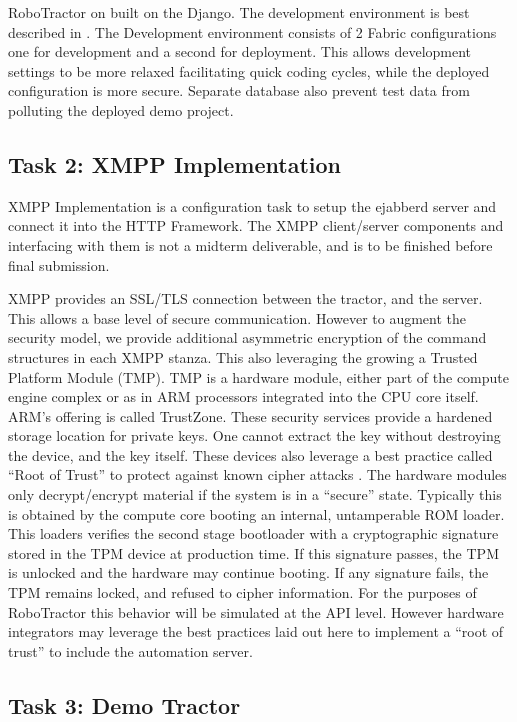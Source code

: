 \documentclass[conference,12pt]{IEEEtran}
\begin{document}
RoboTractor on built on the Django. The development environment is best
described in \autocite{_django_2014}. The Development environment consists of
2 Fabric configurations one for development and a second for deployment. This
  allows development settings to be more relaxed facilitating quick coding
  cycles, while the deployed configuration is more secure. Separate database
  also prevent test data from polluting the deployed demo project.

\subsection{Task 2: XMPP Implementation}
\label{sec:xmpp}
XMPP Implementation is a configuration task to setup the ejabberd server and
connect it into the HTTP Framework. The XMPP client/server components and
interfacing with them is not a midterm deliverable, and is to be finished before
final submission.

XMPP provides an SSL/TLS connection between the tractor, and the server. This
allows a base level of secure communication.  However to augment the security
model, we provide additional asymmetric encryption of the command structures
in each XMPP stanza.  This also leveraging the growing a Trusted Platform
Module (TMP). TMP is a hardware module, either part of the compute engine
complex or as in ARM processors integrated into the CPU core itself.  ARM's
offering is called TrustZone.  These security services provide a hardened
storage location for private keys.  One cannot extract the key without
destroying the device, and the key itself.  These devices also leverage a best
practice called ``Root of Trust'' to protect against known cipher attacks
\autocite{_tpm_2013}.  The
hardware modules only decrypt/encrypt material if the system is in a ``secure''
state.  Typically this is obtained by the compute core booting an internal,
untamperable ROM loader.  This loaders verifies the second stage bootloader with
a cryptographic signature stored in the TPM device at production time. If this
signature passes, the TPM is unlocked and the hardware may continue booting. If
any signature fails, the TPM remains locked, and refused to cipher information.
For the purposes of RoboTractor this behavior will be simulated at the API
level.  However hardware integrators may leverage the best practices laid out
here to implement a ``root of trust'' to include the automation server.  

\subsection{Task 3: Demo Tractor}
\end{document}

